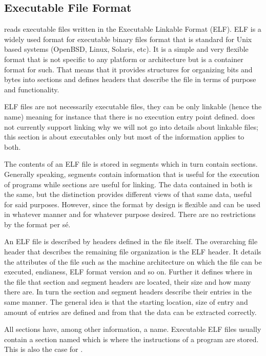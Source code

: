 \subsection{Executable File Format}

\thename{} reads executable files written in the Executable Linkable Format
(ELF). ELF is a widely used format for executable binary files format that is
standard for Unix based systems (OpenBSD, Linux, Solaris, etc\cite{NEEDED}). It
is a simple and very flexible format that is not specific to any platform or
architecture but is a container format for such. That means that it provides
structures for organizing bits and bytes into sections and defines headers that
describe the file in terms of purpose and functionality.

ELF files are not necessarily executable files, they can be only linkable (hence
the name) meaning for instance that there is no execution entry point
defined. \thename{} does not currently support linking why we will not go into
details about linkable files; this section is about executables only but most of
the information applies to both.

The contents of an ELF file is stored in segments which in turn contain
sections. Generally speaking, segments contain information that is useful for
the execution of programs while sections are useful for linking. The data
contained in both is the same, but the distinction provides different views of
that same data, useful for said purposes\cite{elf-spec}. However, since the
format by design is flexible and can be used in whatever manner and for whatever
purpose desired. There are no restrictions by the format per s\'e.

An ELF file is described by headers defined in the file itself. The overarching
file header that describes the remaining file organization is the ELF header. It
details the attributes of the file such as the machine architecture on which the
file can be executed, endianess, ELF format version and so on. Further it
defines where in the file that section and segment headers are located, their
size and how many there are. In turn the section and segment headers describe
their entries in the same manner. The general idea is that the starting
location, size of entry and amount of entries are defined and from that the data
can be extracted correctly.

All sections have, among other information, a name. Executable ELF files usually
contain a section named  which is where the instructions of a
program are stored. This is also the case for \thename{}. %

